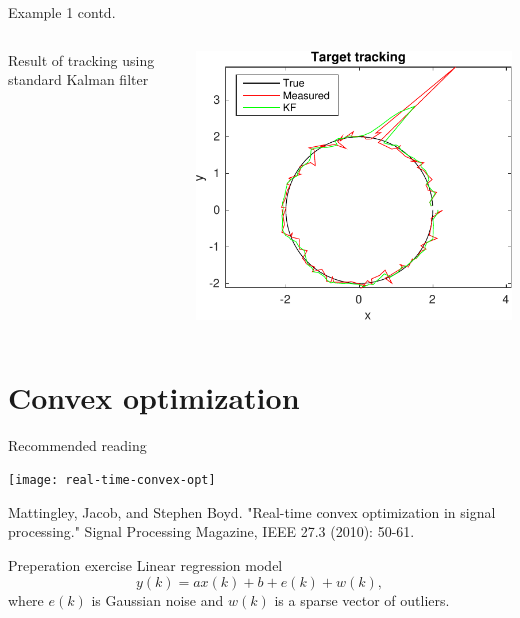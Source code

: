 \documentclass[presentation,aspectratio=169]{beamer}
\begin{document}
\begin{frame}[label=sec-1-5]{Example 1 contd.}
\begin{columns}
\begin{column}{0.3\textwidth}
Result of tracking using standard Kalman filter
\end{column}
\begin{column}{0.7\textwidth}
\begin{center}
\includegraphics[width=0.9\linewidth]{circular-movement-kf-crop}
\end{center}
\end{column}
\end{columns}
\end{frame}
\section{Convex optimization}
\label{sec-2}
\begin{frame}[label=sec-2-1]{Recommended reading}
\begin{center}
\texttt{[image: real-time-convex-opt]}
\end{center}
Mattingley, Jacob, and Stephen Boyd. "Real-time convex optimization in signal processing." Signal Processing Magazine, IEEE 27.3 (2010): 50-61.
\end{frame}

\begin{frame}[label=sec-2-2]{Preperation exercise}
Linear regression model
\begin{equation*}
y(k) = ax(k) + b + e(k) + w(k), 
\end{equation*}
where $e(k)$ is Gaussian noise and $w(k)$ is a sparse vector of outliers.
\end{frame}
\end{document}
